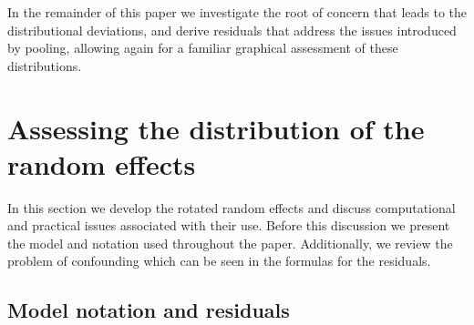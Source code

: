 \documentclass[12pt]{article} %
\newcommand{\hh}[1]{{\color{orange} #1}}
\begin{document}


In the remainder of this paper we investigate the root of concern that leads to the distributional deviations, and derive residuals that address the issues introduced by pooling, allowing again for a familiar graphical assessment of these distributions.

\section{Assessing the distribution of the random effects}\label{sec:}

In this section we develop the rotated random effects and discuss computational and practical issues associated with their use. Before this discussion we present the model and notation used throughout the paper. Additionally, we review the problem of confounding which can be seen in the formulas for the residuals.

\subsection{Model notation and residuals}\label{sec:resid}
\end{document}
